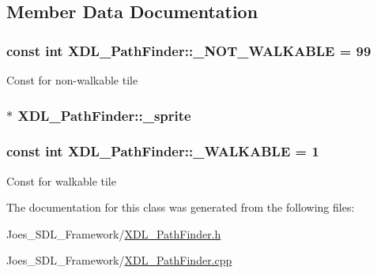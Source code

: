 \subsection{Member Data Documentation}
\hypertarget{class_x_d_l___path_finder_a1d174e5bc28dc523833b199f79fbfc8f}{
\subsubsection[{\-\_\-\-N\-O\-T\-\_\-\-W\-A\-L\-K\-A\-B\-L\-E}]{\setlength{\rightskip}{0pt plus 5cm}const int X\-D\-L\-\_\-\-Path\-Finder\-::\-\_\-\-N\-O\-T\-\_\-\-W\-A\-L\-K\-A\-B\-L\-E = 99\hspace{0.3cm}{\ttfamily [static]}}}\label{class_x_d_l___path_finder_a1d174e5bc28dc523833b199f79fbfc8f}
Const for non-\/walkable tile \hypertarget{class_x_d_l___path_finder_ae21d6af420119875362d125ebf5c73b6}{
\subsubsection[{\-\_\-sprite}]{$\ast$ X\-D\-L\-\_\-\-Path\-Finder\-::\-\_\-sprite}}\label{class_x_d_l___path_finder_ae21d6af420119875362d125ebf5c73b6}
\hypertarget{class_x_d_l___path_finder_a5b9e836a10153d89aeb75c70954937c9}{
\subsubsection[{\-\_\-\-W\-A\-L\-K\-A\-B\-L\-E}]{\setlength{\rightskip}{0pt plus 5cm}const int X\-D\-L\-\_\-\-Path\-Finder\-::\-\_\-\-W\-A\-L\-K\-A\-B\-L\-E = 1\hspace{0.3cm}{\ttfamily [static]}}}\label{class_x_d_l___path_finder_a5b9e836a10153d89aeb75c70954937c9}
Const for walkable tile 

The documentation for this class was generated from the following files\-:\begin{DoxyCompactItemize}
\item 
Joes\-\_\-\-S\-D\-L\-\_\-\-Framework/\hyperlink{_x_d_l___path_finder_8h}{X\-D\-L\-\_\-\-Path\-Finder.\-h}\item 
Joes\-\_\-\-S\-D\-L\-\_\-\-Framework/\hyperlink{_x_d_l___path_finder_8cpp}{X\-D\-L\-\_\-\-Path\-Finder.\-cpp}\end{DoxyCompactItemize}
